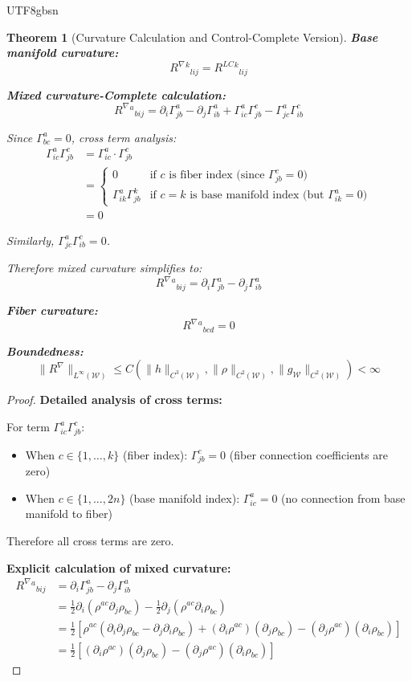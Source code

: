 \documentclass[a4paper,12pt]{extarticle}
\newtheorem{theorem}{Theorem}
\theoremstyle{definition}
\begin{document}
\begin{CJK}{UTF8}{gbsn}
\begin{theorem}[Curvature Calculation and Control-Complete Version]
\textbf{Base manifold curvature:}
$$R^{\nabla}{}^k{}_{lij} = R^{LC}{}^k{}_{lij}$$

\textbf{Mixed curvature-Complete calculation:}
$$R^{\nabla}{}^a{}_{bij} = \partial_i \Gamma^a_{jb} - \partial_j \Gamma^a_{ib} + \Gamma^a_{ic}\Gamma^c_{jb} - \Gamma^a_{jc}\Gamma^c_{ib}$$

Since $\Gamma^a_{bc} = 0$, cross term analysis:
\begin{align*}
\Gamma^a_{ic}\Gamma^c_{jb} &= \Gamma^a_{ic} \cdot \Gamma^c_{jb}\\
&= \begin{cases}
0 & \text{if } c \text{ is fiber index (since } \Gamma^c_{jb} = 0 \text{)}\\
\Gamma^a_{ik} \Gamma^k_{jb} & \text{if } c = k \text{ is base manifold index (but } \Gamma^a_{ik} = 0 \text{)}
\end{cases}\\
&= 0
\end{align*}

Similarly, $\Gamma^a_{jc}\Gamma^c_{ib} = 0$.

Therefore mixed curvature simplifies to:
$$R^{\nabla}{}^a{}_{bij} = \partial_i \Gamma^a_{jb} - \partial_j \Gamma^a_{ib}$$

\textbf{Fiber curvature:}
$$R^{\nabla}{}^a{}_{bcd} = 0$$

\textbf{Boundedness:}
$$\|R^\nabla\|_{L^\infty(\mathcal{W})} \leq C(\|h\|_{C^3(\mathcal{W})}, \|\rho\|_{C^2(\mathcal{W})}, \|g_{\mathcal{W}}\|_{C^2(\mathcal{W})}) < \infty$$
\end{theorem}
\begin{proof}
\textbf{Detailed analysis of cross terms:}

For term $\Gamma^a_{ic}\Gamma^c_{jb}$:
\begin{itemize}
\item When $c \in \{1,\ldots,k\}$ (fiber index): $\Gamma^c_{jb} = 0$ (fiber connection coefficients are zero)
\item When $c \in \{1,\ldots,2n\}$ (base manifold index): $\Gamma^a_{ic} = 0$ (no connection from base manifold to fiber)
\end{itemize}

Therefore all cross terms are zero.

\textbf{Explicit calculation of mixed curvature:}
\begin{align*}
R^{\nabla}{}^a{}_{bij} &= \partial_i \Gamma^a_{jb} - \partial_j \Gamma^a_{ib}\\
&= \frac{1}{2}\partial_i(\rho^{ac} \partial_j \rho_{bc}) - \frac{1}{2}\partial_j(\rho^{ac} \partial_i \rho_{bc})\\
&= \frac{1}{2}[\rho^{ac}(\partial_i \partial_j \rho_{bc} - \partial_j \partial_i \rho_{bc}) + (\partial_i \rho^{ac})(\partial_j \rho_{bc}) - (\partial_j \rho^{ac})(\partial_i \rho_{bc})]\\
&= \frac{1}{2}[(\partial_i \rho^{ac})(\partial_j \rho_{bc}) - (\partial_j \rho^{ac})(\partial_i \rho_{bc})]
\end{align*}


\end{proof}
\end{CJK}
\end{document}
